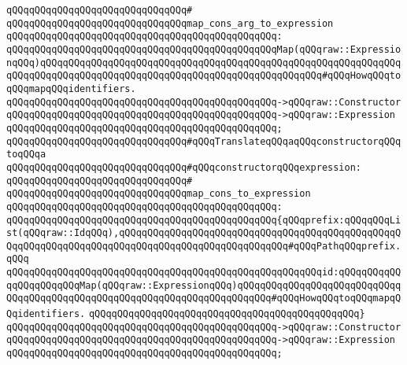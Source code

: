 \verb|qQQqqQQqqQQqqQQqqQQqqQQqqQQqqQQq#|\newline
\verb|qQQqqQQqqQQqqQQqqQQqqQQqqQQqqQQqmap_cons_arg_to_expression|\newline
\verb|qQQqqQQqqQQqqQQqqQQqqQQqqQQqqQQqqQQqqQQqqQQqqQQq:|\newline
\verb|qQQqqQQqqQQqqQQqqQQqqQQqqQQqqQQqqQQqqQQqqQQqqQQqMap(qQQqraw::ExpressionqQQq)qQQqqQQqqQQqqQQqqQQqqQQqqQQqqQQqqQQqqQQqqQQqqQQqqQQqqQQqqQQqqQQqqQQqqQQqqQQqqQQqqQQqqQQqqQQqqQQqqQQqqQQqqQQqqQQqqQQqqQQq#qQQqHowqQQqtoqQQqmapqQQqidentifiers.|\newline
\verb|qQQqqQQqqQQqqQQqqQQqqQQqqQQqqQQqqQQqqQQqqQQqqQQq->qQQqraw::Constructor|\newline
\verb|qQQqqQQqqQQqqQQqqQQqqQQqqQQqqQQqqQQqqQQqqQQqqQQq->qQQqraw::Expression|\newline
\verb|qQQqqQQqqQQqqQQqqQQqqQQqqQQqqQQqqQQqqQQqqQQqqQQq;|\newline
\newline
\verb|qQQqqQQqqQQqqQQqqQQqqQQqqQQqqQQq#qQQqTranslateqQQqaqQQqconstructorqQQqtoqQQqa|\newline
\verb|qQQqqQQqqQQqqQQqqQQqqQQqqQQqqQQq#qQQqconstructorqQQqexpression:|\newline
\verb|qQQqqQQqqQQqqQQqqQQqqQQqqQQqqQQq#|\newline
\verb|qQQqqQQqqQQqqQQqqQQqqQQqqQQqqQQqmap_cons_to_expression|\newline
\verb|qQQqqQQqqQQqqQQqqQQqqQQqqQQqqQQqqQQqqQQqqQQqqQQq:|\newline
\verb|qQQqqQQqqQQqqQQqqQQqqQQqqQQqqQQqqQQqqQQqqQQqqQQq{qQQqprefix:qQQqqQQqList(qQQqraw::IdqQQq),qQQqqQQqqQQqqQQqqQQqqQQqqQQqqQQqqQQqqQQqqQQqqQQqqQQqqQQqqQQqqQQqqQQqqQQqqQQqqQQqqQQqqQQqqQQqqQQqqQQq#qQQqPathqQQqprefix.qQQq|\newline
\verb|qQQqqQQqqQQqqQQqqQQqqQQqqQQqqQQqqQQqqQQqqQQqqQQqqQQqqQQqid:qQQqqQQqqQQqqQQqqQQqqQQqMap(qQQqraw::ExpressionqQQq)qQQqqQQqqQQqqQQqqQQqqQQqqQQqqQQqqQQqqQQqqQQqqQQqqQQqqQQqqQQqqQQqqQQqqQQqqQQq#qQQqHowqQQqtoqQQqmapqQQqidentifiers.|\newline
\verb|qQQqqQQqqQQqqQQqqQQqqQQqqQQqqQQqqQQqqQQqqQQqqQQq}|\newline
\verb|qQQqqQQqqQQqqQQqqQQqqQQqqQQqqQQqqQQqqQQqqQQqqQQq->qQQqraw::Constructor|\newline
\verb|qQQqqQQqqQQqqQQqqQQqqQQqqQQqqQQqqQQqqQQqqQQqqQQq->qQQqraw::Expression|\newline
\verb|qQQqqQQqqQQqqQQqqQQqqQQqqQQqqQQqqQQqqQQqqQQqqQQq;|\newline
\newline
